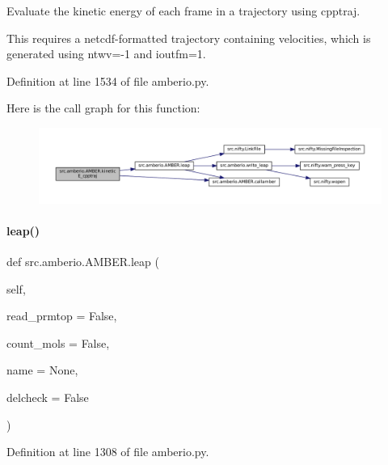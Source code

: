 Evaluate the kinetic energy of each frame in a trajectory using cpptraj. 

This requires a netcdf-\/formatted trajectory containing velocities, which is generated using ntwv=-\/1 and ioutfm=1. 

Definition at line 1534 of file amberio.\+py.

Here is the call graph for this function\+:
\nopagebreak
\begin{figure}[H]
\begin{center}
\leavevmode
\includegraphics[width=350pt]{classsrc_1_1amberio_1_1AMBER_ad7c82d0258dc29e9326b0ee188097fca_cgraph}
\end{center}
\end{figure}
\mbox{\label{classsrc_1_1amberio_1_1AMBER_a8cb2d1848fd4fa90dd2998e38592a21e}} 
\paragraph{\texorpdfstring{leap()}{leap()}}
{\footnotesize\ttfamily def src.\+amberio.\+A\+M\+B\+E\+R.\+leap (\begin{DoxyParamCaption}\item[{}]{self,  }\item[{}]{read\+\_\+prmtop = {\ttfamily False},  }\item[{}]{count\+\_\+mols = {\ttfamily False},  }\item[{}]{name = {\ttfamily None},  }\item[{}]{delcheck = {\ttfamily False} }\end{DoxyParamCaption})}



Definition at line 1308 of file amberio.\+py.

